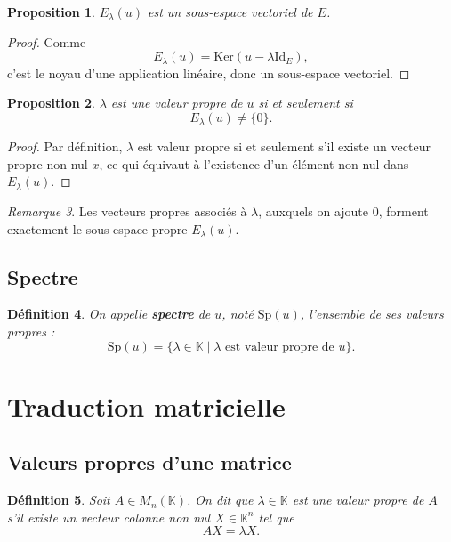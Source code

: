 \documentclass[11pt,a4paper]{article}
\newtheorem{definition}{Définition}[section]
\newtheorem{proposition}[definition]{Proposition}
\theoremstyle{remark}
\newtheorem{remarque}[definition]{Remarque}
\newcommand{\K}{\mathbb{K}}
\newcommand{\Ker}{\mathrm{Ker}}
\newcommand{\id}{\mathrm{Id}}
\newcommand{\Sp}{\mathrm{Sp}}
\begin{document}
\begin{proposition}
\(E_\lambda(u)\) est un sous-espace vectoriel de \(E\).
\end{proposition}

\begin{proof}
Comme
\[
E_\lambda(u)=\Ker(u-\lambda\id_E),
\]
c’est le noyau d’une application linéaire, donc un sous-espace vectoriel.
\end{proof}

\begin{proposition}
\(\lambda\) est une valeur propre de \(u\) si et seulement si
\[
E_\lambda(u)\neq \{0\}.
\]
\end{proposition}

\begin{proof}
Par définition, \(\lambda\) est valeur propre si et seulement s’il existe un vecteur propre non nul \(x\), ce qui équivaut à l’existence d’un élément non nul dans \(E_\lambda(u)\).
\end{proof}

\begin{remarque}
Les vecteurs propres associés à \(\lambda\), auxquels on ajoute \(0\), forment exactement le sous-espace propre \(E_\lambda(u)\).
\end{remarque}

\subsection{Spectre}

\begin{definition}
On appelle \textbf{spectre} de \(u\), noté \(\Sp(u)\), l’ensemble de ses valeurs propres :
\[
\Sp(u)=\{\lambda\in\K\mid \lambda \text{ est valeur propre de }u\}.
\]
\end{definition}

\section{Traduction matricielle}

\subsection{Valeurs propres d’une matrice}

\begin{definition}
Soit \(A\in M_n(\K)\).  
On dit que \(\lambda\in\K\) est une valeur propre de \(A\) s’il existe un vecteur colonne non nul \(X\in\K^n\) tel que
\[
AX=\lambda X.
\]
\end{definition}
\end{document}
